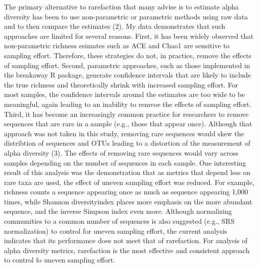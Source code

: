 \documentclass[
]{article}
\begin{document}
The primary alternative to rarefaction that many advise is to estimate
alpha diversity has been to use non-parametric or parametric methods
using raw data and to then compare the estimates (2). My data
demonstrates that such approaches are limited for several reasons.
First, it has been widely observed that non-parametric richness esimates
such as ACE and Chao1 are sensitive to sampling effort. Therefore, these
strategies do not, in practice, remove the effects of sampling effort.
Second, parametric approaches, such as those implemented in the
breakaway R package, generate confidence intervals that are likely to
include the true richness and theoretically shrink with increased
sampling effort. For most samples, the confidence intervals around the
estimates are too wide to be meaningful, again leading to an inability
to remvoe the effects of sampling effort. Third, it has become an
increasingly common practice for researchers to remove sequences that
are rare in a sample (e.g., those that appear once). Although that
approach was not taken in this study, removing rare sequences would skew
the distribtion of sequences and OTUs leading to a distortion of the
measurement of alpha diversity (3). The effects of removing rare
sequences would vary across samples depending on the number of sequences
in each sample. One interesting result of this analysis was the
demonstration that as metrics that depend less on rare taxa are used,
the effect of uneven sampling effort was reduced. For example, richness
counts a sequence appearing once as much as sequence appearing 1,000
times, while Shannon diversityindex places more emphasis on the more
abundant sequence, and the inverse Simpson index even more. Although
normalizing communities to a common number of sequences is also
suggested (e.g., SRS normalization) to control for uneven sampling
effort, the current analysis indicates that its performance does not
meet that of rarefaction. For analysis of alpha diversity metrics,
rarefaction is the most effective and consistent approach to control fo
uneven sampling effort.
\end{document}
